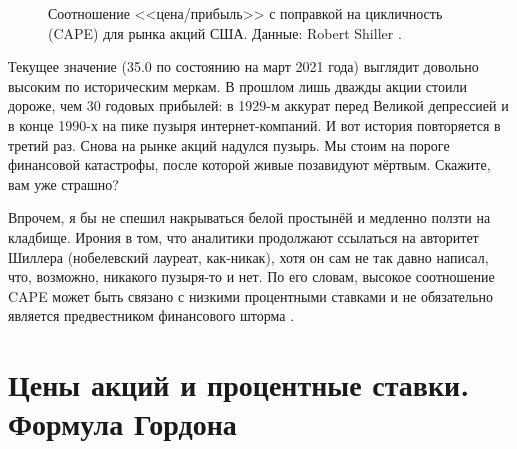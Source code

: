 \begin{figure}[ht]
\centering
{}
\caption{Соотношение <<цена/прибыль>> с поправкой на цикличность (CAPE) для 
рынка акций США. Данные: Robert Shiller \cite{shillerOnline}.}
\label{shiller_pe_historical_chart}
\end{figure}

Текущее значение (35.0 по состоянию на март 2021 года) выглядит довольно 
высоким по историческим меркам. В прошлом лишь дважды акции стоили дороже, чем 
30 годовых прибылей: в 1929-м аккурат перед Великой депрессией и в конце 1990-х 
на пике пузыря интернет-компаний. И вот история повторяется в третий раз. Снова 
на рынке акций надулся пузырь. Мы стоим на пороге финансовой катастрофы, после 
которой живые позавидуют мёртвым. Скажите, вам уже страшно?

Впрочем, я бы не спешил накрываться белой простынёй и медленно ползти на 
кладбище. Ирония в том, что аналитики продолжают ссылаться на авторитет Шиллера 
(нобелевский лауреат, как-никак), хотя он сам не так давно написал, что, 
возможно, никакого пузыря-то и нет. По его словам, высокое соотношение CAPE 
может быть связано с низкими процентными ставками и не обязательно является 
предвестником финансового шторма \cite{shiller2020cape}.

\section*{Цены акций и процентные ставки. Формула Гордона}

